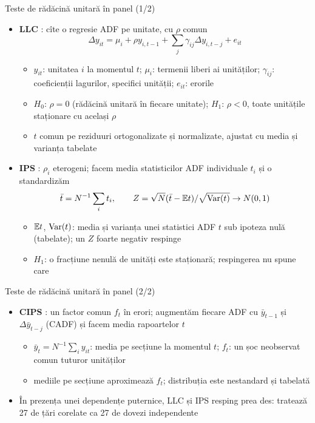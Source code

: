 \begin{frame}{Teste de rădăcină unitară în panel (1/2)}
\itemsize{\small}
\begin{itemize}
    \item \textbf{LLC} : cîte o regresie ADF pe unitate, cu $\rho$ comun \[ \Delta y_{it} = \mu_i + \rho y_{i,t-1} + \sum_j\gamma_{ij}\Delta y_{i,t-j} + e_{it} \]
    \begin{itemize}
        \item $y_{it}$: unitatea $i$ la momentul $t$; $\mu_i$: termenii liberi ai unităților; $\gamma_{ij}$: coeficienții lagurilor, specifici unității; $e_{it}$: erorile
        \item $H_0$: $\rho = 0$ (rădăcină unitară în fiecare unitate); $H_1$: $\rho < 0$, toate unitățile staționare cu același $\rho$
        \item $t$ comun pe reziduuri ortogonalizate și normalizate, ajustat cu media și varianța tabelate
    \end{itemize}
    \item \textbf{IPS} : $\rho_i$ eterogeni; facem media statisticilor ADF individuale $t_i$ și o standardizăm \[ \bar t = N^{-1}\sum_i t_i, \qquad Z = \sqrt N(\bar t - \mathbb{E} t)/\sqrt{\text{Var}(t)} \to N(0, 1) \]
    \begin{itemize}
        \item $\mathbb{E} t$, $\text{Var}(t)$: media și varianța unei statistici ADF $t$ sub ipoteza nulă (tabelate); un $Z$ foarte negativ respinge
        \item $H_1$: o fracțiune nenulă de unități este staționară; respingerea nu spune care
    \end{itemize}
\end{itemize}
\end{frame}

\begin{frame}{Teste de rădăcină unitară în panel (2/2)}
\itemsize{\small}
\begin{itemize}
    \item \textbf{CIPS} : un factor comun $f_t$ în erori; augmentăm fiecare ADF cu $\bar y_{t-1}$ și $\Delta\bar y_{t-j}$ (CADF) și facem media rapoartelor $t$
    \begin{itemize}
        \item $\bar y_t = N^{-1}\sum_i y_{it}$: media pe secțiune la momentul $t$; $f_t$: un șoc neobservat comun tuturor unităților
        \item mediile pe secțiune aproximează $f_t$; distribuția este nestandard și tabelată
    \end{itemize}
    \item În prezența unei dependențe puternice, LLC și IPS resping prea des: tratează 27 de țări corelate ca 27 de dovezi independente
\end{itemize}
\end{frame}

